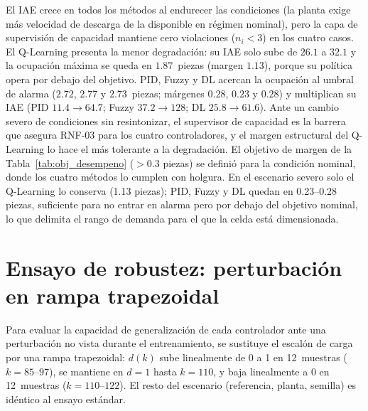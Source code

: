 El IAE crece en todos los métodos al endurecer las condiciones (la planta exige más velocidad de descarga de la disponible en régimen nominal), pero la capa de supervisión de capacidad mantiene cero violaciones ($n_i<3$) en los cuatro casos. El Q-Learning presenta la menor degradación: su IAE solo sube de $26.1$ a $32.1$ y la ocupación máxima se queda en $1.87$~piezas (margen $1.13$), porque su política opera por debajo del objetivo. PID, Fuzzy y DL acercan la ocupación al umbral de alarma ($2.72$, $2.77$ y $2.73$~piezas; márgenes $0.28$, $0.23$ y $0.28$) y multiplican su IAE (PID $11.4\to64.7$; Fuzzy $37.2\to128$; DL $25.8\to61.6$). Ante un cambio severo de condiciones sin resintonizar, el supervisor de capacidad es la barrera que asegura RNF-03 para los cuatro controladores, y el margen estructural del Q-Learning lo hace el más tolerante a la degradación. El objetivo de margen de la Tabla~\ref{tab:obj_desempeno} ($>0.3$ piezas) se definió para la condición nominal, donde los cuatro métodos lo cumplen con holgura. En el escenario severo solo el Q-Learning lo conserva (1.13 piezas); PID, Fuzzy y DL quedan en 0.23--0.28 piezas, suficiente para no entrar en alarma pero por debajo del objetivo nominal, lo que delimita el rango de demanda para el que la celda está dimensionada.

\section{Ensayo de robustez: perturbación en rampa trapezoidal}
\label{sec:robustez_rampa}

Para evaluar la capacidad de generalización de cada controlador ante una perturbación no vista durante el entrenamiento, se sustituye el escalón de carga por una rampa trapezoidal: $d(k)$ sube linealmente de 0 a 1 en 12~muestras ($k=85$--$97$), se mantiene en $d=1$ hasta $k=110$, y baja linealmente a 0 en 12~muestras ($k=110$--$122$). El resto del escenario (referencia, planta, semilla) es idéntico al ensayo estándar.


